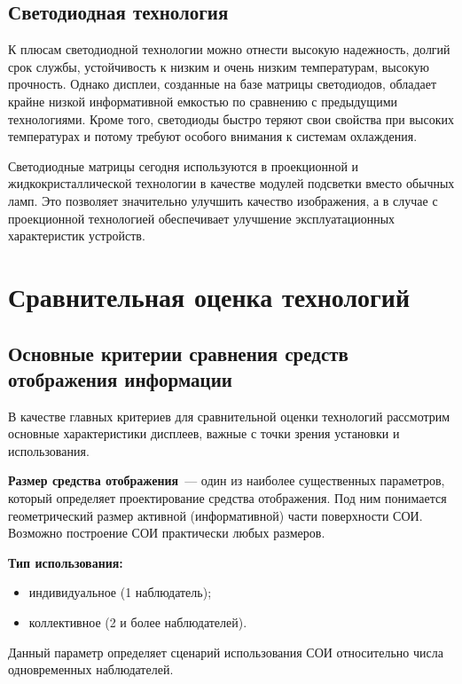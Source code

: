 \begin{multicols}{2}
\subsection{Светодиодная технология} %

     К плюсам светодиодной технологии можно отнести высокую 
надежность, долгий срок службы, устойчивость к низким и очень низким 
температурам, высокую прочность. Однако дисплеи, созданные на базе 
матрицы светодиодов, обладает крайне низкой информативной емкостью по 
сравнению с предыдущими технологиями. Кроме того, светодиоды быстро 
теряют свои свойства при высоких температурах и потому требуют особого 
внимания к системам охлаждения. 
     
     Светодиодные матрицы сегодня используются в проекционной и 
жидкокристаллической технологии в качестве модулей подсветки вместо 
обычных ламп. Это позволяет значительно улучшить качество изображения, 
а в случае с проекционной технологией обеспечивает улучшение 
эксплуатационных характеристик устройств. 
    
\section{Сравнительная оценка технологий}

\subsection{Основные критерии сравнения средств отображения 
информации} %

     В качестве главных критериев для сравнительной оценки технологий 
рассмотрим основные характеристики дисплеев, важные с точки зрения 
установки и использования.

\textbf{Размер средства отображения}~--- один из наиболее существенных 
параметров, который определяет проектирование средства отображения. Под 
ним понимается геометрический размер активной (информативной) части 
поверхности СОИ. Возможно построение СОИ практически любых размеров. 

\textbf{Тип использования: }
\begin{itemize}
\item индивидуальное (1 наблюдатель);
\item коллективное (2 и более наблюдателей).
\end{itemize}

Данный параметр определяет сценарий использования СОИ относительно 
числа одновременных наблюдателей. 
     

\end{multicols}

